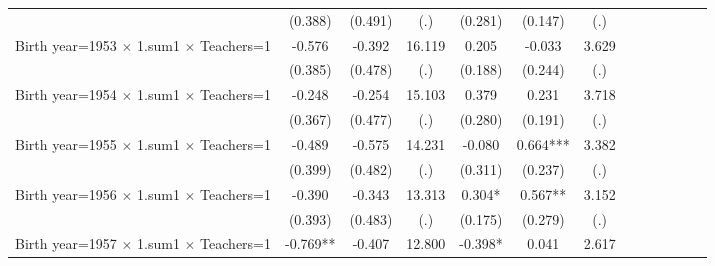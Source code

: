 {\begin{tabular}{l*{12}{c}}
                    &     (0.388)   &     (0.491)   &         (.)   &     (0.281)   &     (0.147)   &         (.)   &               &               &               &               &               &               \\
Birth year=1953 $\times$ 1.sum1 $\times$ Teachers=1&      -0.576   &      -0.392   &      16.119   &       0.205   &      -0.033   &       3.629   &               &               &               &               &               &               \\
                    &     (0.385)   &     (0.478)   &         (.)   &     (0.188)   &     (0.244)   &         (.)   &               &               &               &               &               &               \\
Birth year=1954 $\times$ 1.sum1 $\times$ Teachers=1&      -0.248   &      -0.254   &      15.103   &       0.379   &       0.231   &       3.718   &               &               &               &               &               &               \\
                    &     (0.367)   &     (0.477)   &         (.)   &     (0.280)   &     (0.191)   &         (.)   &               &               &               &               &               &               \\
Birth year=1955 $\times$ 1.sum1 $\times$ Teachers=1&      -0.489   &      -0.575   &      14.231   &      -0.080   &       0.664***&       3.382   &               &               &               &               &               &               \\
                    &     (0.399)   &     (0.482)   &         (.)   &     (0.311)   &     (0.237)   &         (.)   &               &               &               &               &               &               \\
Birth year=1956 $\times$ 1.sum1 $\times$ Teachers=1&      -0.390   &      -0.343   &      13.313   &       0.304*  &       0.567** &       3.152   &               &               &               &               &               &               \\
                    &     (0.393)   &     (0.483)   &         (.)   &     (0.175)   &     (0.279)   &         (.)   &               &               &               &               &               &               \\
Birth year=1957 $\times$ 1.sum1 $\times$ Teachers=1&      -0.769** &      -0.407   &      12.800   &      -0.398*  &       0.041   &       2.617   &               &               &               &               &               &               \\

\end{tabular}}
